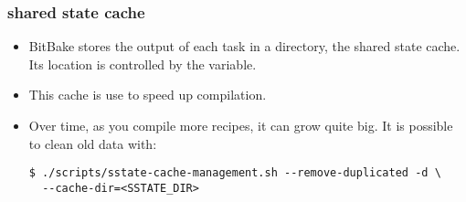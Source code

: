 \begin{frame}[fragile]
  \frametitle{shared state cache}
  \begin{itemize}
    \item BitBake stores the output of each task in a directory, the
      shared state cache. Its location is controlled by the
       variable.
    \item This cache is use to speed up compilation.
    \item Over time, as you compile more recipes, it can grow quite
      big. It is possible to clean old data with:
      \begin{block}{}
        \begin{verbatim}
$ ./scripts/sstate-cache-management.sh --remove-duplicated -d \
  --cache-dir=<SSTATE_DIR>
        \end{verbatim}
      \end{block}
  \end{itemize}
\end{frame}
